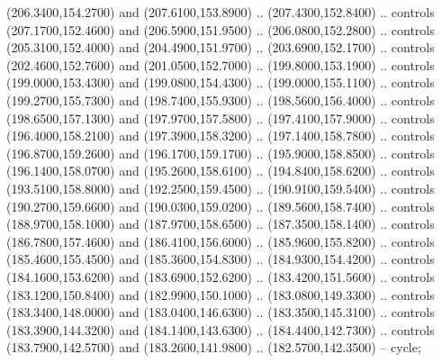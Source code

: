 {\begin{scope}[y=0.80pt, x=0.80pt, yscale=-1, xscale=1, inner sep=0pt, outer sep=0pt, #1]
      (206.3400,154.2700) and (207.6100,153.8900) .. (207.4300,152.8400) .. controls
      (207.1700,152.4600) and (206.5900,151.9500) .. (206.0800,152.2800) .. controls
      (205.3100,152.4000) and (204.4900,151.9700) .. (203.6900,152.1700) .. controls
      (202.4600,152.7600) and (201.0500,152.7000) .. (199.8000,153.1900) .. controls
      (199.0000,153.4300) and (199.0800,154.4300) .. (199.0000,155.1100) .. controls
      (199.2700,155.7300) and (198.7400,155.9300) .. (198.5600,156.4000) .. controls
      (198.6500,157.1300) and (197.9700,157.5800) .. (197.4100,157.9000) .. controls
      (196.4000,158.2100) and (197.3900,158.3200) .. (197.1400,158.7800) .. controls
      (196.8700,159.2600) and (196.1700,159.1700) .. (195.9000,158.8500) .. controls
      (196.1400,158.0700) and (195.2600,158.6100) .. (194.8400,158.6200) .. controls
      (193.5100,158.8000) and (192.2500,159.4500) .. (190.9100,159.5400) .. controls
      (190.2700,159.6600) and (190.0300,159.0200) .. (189.5600,158.7400) .. controls
      (188.9700,158.1000) and (187.9700,158.6500) .. (187.3500,158.1400) .. controls
      (186.7800,157.4600) and (186.4100,156.6000) .. (185.9600,155.8200) .. controls
      (185.4600,155.4500) and (185.3600,154.8300) .. (184.9300,154.4200) .. controls
      (184.1600,153.6200) and (183.6900,152.6200) .. (183.4200,151.5600) .. controls
      (183.1200,150.8400) and (182.9900,150.1000) .. (183.0800,149.3300) .. controls
      (183.3400,148.0000) and (183.0400,146.6300) .. (183.3500,145.3100) .. controls
      (183.3900,144.3200) and (184.1400,143.6300) .. (184.4400,142.7300) .. controls
      (183.7900,142.5700) and (183.2600,141.9800) .. (182.5700,142.3500) -- cycle;


\end{scope}}
